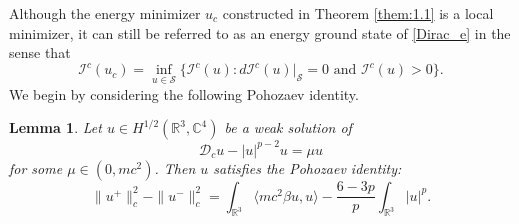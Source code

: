 \documentclass{amsart}
\theoremstyle{plain}
\newtheorem{lemma}[theorem]{Lemma}
\theoremstyle{definition}
\theoremstyle{remark}
\numberwithin{equation}{section} \numberwithin{figure}{section}
\begin{document}
Although the energy minimizer $u_c$ constructed in Theorem \ref{them:1.1} is a local
minimizer, it can still be referred to as an energy ground state of \eqref{Dirac_e} in the sense that
   $$
    \mathcal{I}^{c}(u_c)= \inf\limits_{u\in\mathcal{S}}\{\mathcal{I}^{c}(u): d\mathcal{I}^{c}(u)|_{\mathcal{S}} =0 \,\,\text{and}\,\,\mathcal{I}^{c}(u)>0 \}.
    $$
    We begin by considering the following Pohozaev identity.
    \begin{lemma}\label{Pohozaev} 
      Let \( u \in H^{1/2}(\mathbb{R}^3, \mathbb{C}^4) \) be a weak solution of
      \begin{equation}\label{eqat}
          \mathscr{D}_{c} u - |u|^{p-2}u = \mu u
      \end{equation}
      for some \( \mu \in (0, mc^2) \). Then \( u \) satisfies the Pohozaev identity:
      \begin{equation}
          \|u^+\|_c^2 - \|u^-\|_c^2 = \int_{\mathbb{R}^3} \langle m c^2 \beta u, u \rangle - \frac{6 - 3p}{p} \int_{\mathbb{R}^3} |u|^p.
      \end{equation}
  \end{lemma}
  
\end{document}
